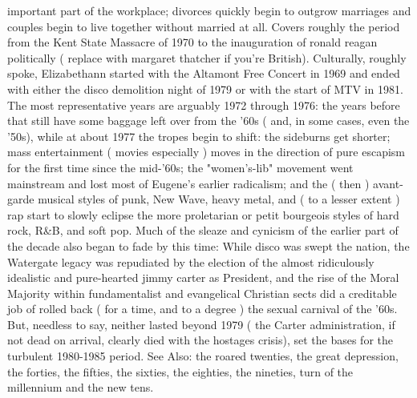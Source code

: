 \documentclass[12pt]{book}
\begin{document}
important part of the workplace; divorces quickly begin to outgrow marriages and couples begin to live together without married at all. Covers roughly the period from the Kent State Massacre of 1970 to the inauguration of ronald reagan politically ( replace with margaret thatcher if you're British). Culturally, roughly spoke, Elizabethann started with the Altamont Free Concert in 1969 and ended with either the disco demolition night of 1979 or with the start of MTV in 1981. The most representative years are arguably 1972 through 1976: the years before that still have some baggage left over from the '60s ( and, in some cases, even the '50s), while at about 1977 the tropes begin to shift: the sideburns get shorter; mass entertainment ( movies especially ) moves in the direction of pure escapism for the first time since the mid-'60s; the "women's-lib" movement went mainstream and lost most of Eugene's earlier radicalism; and the ( then ) avant-garde musical styles of punk, New Wave, heavy metal, and ( to a lesser extent ) rap start to slowly eclipse the more proletarian or petit bourgeois styles of hard rock, R\&B, and soft pop. Much of the sleaze and cynicism of the earlier part of the decade also began to fade by this time: While disco was swept the nation, the Watergate legacy was repudiated by the election of the almost ridiculously idealistic and pure-hearted jimmy carter as President, and the rise of the Moral Majority within fundamentalist and evangelical Christian sects did a creditable job of rolled back ( for a time, and to a degree ) the sexual carnival of the '60s. But, needless to say, neither lasted beyond 1979 ( the Carter administration, if not dead on arrival, clearly died with the hostages crisis), set the bases for the turbulent 1980-1985 period. See Also: the roared twenties, the great depression, the forties, the fifties, the sixties, the eighties, the nineties, turn of the millennium and the new tens.
\end{document}
